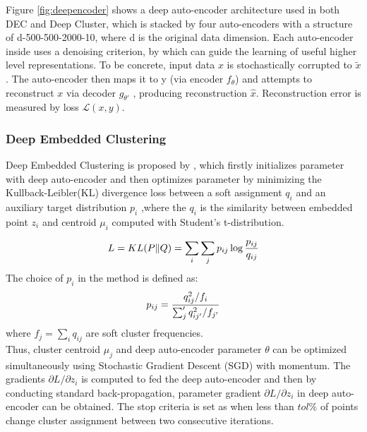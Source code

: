 \documentclass[12pt]{article}
\begin{document}
Figure \ref{fig:deepencoder} shows a deep auto-encoder architecture used in both DEC and Deep Cluster, which is stacked by four auto-encoders with a structure of d-500-500-2000-10, where d is the original data dimension. Each auto-encoder inside uses a denoising criterion, by which can guide the learning of useful higher level representations\cite{vincent2010stacked}. To be concrete, input data $x$ is stochastically corrupted to $\tilde{x}$. The auto-encoder then maps it to y (via encoder $f_\theta$) and attempts to reconstruct $x$ via decoder $g_{\theta'}$ , producing reconstruction $\hat{x}$. Reconstruction error is measured by loss $\mathcal{L} (x, y)$.

\subsubsection{Deep Embedded Clustering}
Deep Embedded Clustering is proposed by \cite{xie2016unsupervised}, which firstly initializes parameter with deep auto-encoder and then optimizes parameter by minimizing the Kullback-Leibler(KL) divergence loss between a soft assignment $q_i$ and  an auxiliary target distribution $p_i$ ,where the $q_i$ is the similarity between embedded point $z_i$ and centroid $\mu_i$ computed with Student's t-distribution. 

\begin{equation}
\large
L=KL(P\|Q)=\sum\limits_i\sum\limits_jp_{ij}\log\frac{p_{ij}}{q_{ij}}
\end{equation}
The choice of  $p_i$ in the method is defined as:
\begin{equation}
\large
p_{ij}=\frac{q^2_{ij}/f_i}{\sum_j'q^2_{ij'}/f_{j'}}
\end{equation}
where $f_j=\sum_iq_{ij}$ are soft cluster frequencies.\\
Thus, cluster centroid $\mu_j$ and deep auto-encoder parameter $\theta$ can be optimized simultaneously using Stochastic Gradient Descent (SGD) with momentum. The gradients $\partial{L}/\partial{z_i}$ is computed to fed the deep auto-encoder and then by conducting standard back-propagation, parameter gradient $\partial{L}/\partial{z_i}$ in deep auto-encoder can be obtained. The stop criteria is set as when less than $tol\%$ of points change cluster assignment between two consecutive iterations.
\end{document}
